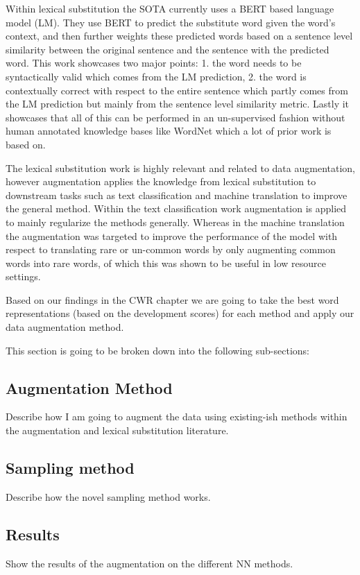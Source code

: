 Within lexical substitution the SOTA currently \cite{aug_zhou-etal-2019-bert} uses a BERT \cite{aug_devlin-etal-2019-bert} based language model (LM). They use BERT to predict the substitute word given the word's context, and then further weights these predicted words based on a sentence level similarity between the original sentence and the sentence with the predicted word. This work showcases two major points: 1. the word needs to be syntactically valid which comes from the LM prediction, 2. the word is contextually correct with respect to the entire sentence which partly comes from the LM prediction but mainly from the sentence level similarity metric. Lastly it showcases that all of this can be performed in an un-supervised fashion without human annotated knowledge bases like WordNet which a lot of prior work is based on.

The lexical substitution work is highly relevant and related to data augmentation, however augmentation applies the knowledge from lexical substitution to downstream tasks such as text classification \cite{aug_zhang_2015,aug_wang_2015,aug_kobayashi_2018,aug_wu_2018} and machine translation \cite{aug_fadaee_2017} to improve the general method. Within the text classification work augmentation is applied to mainly regularize the methods generally. Whereas in the machine translation the augmentation was targeted to improve the performance of the model with respect to translating rare or un-common words by only augmenting common words into rare words, of which this was shown to be useful in low resource settings.




Based on our findings in the CWR chapter we are going to take the best word representations (based on the development scores) for each method and apply our data augmentation method.

This section is going to be broken down into the following sub-sections:
\subsection{Augmentation Method}
Describe how I am going to augment the data using existing-ish methods within the augmentation and lexical substitution literature.
\subsection{Sampling method}
Describe how the novel sampling method works.
\subsection{Results}
Show the results of the augmentation on the different NN methods.
